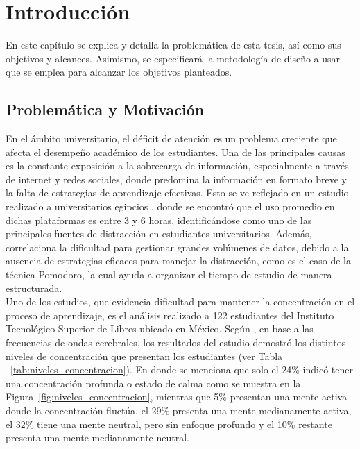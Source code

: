 \chapter{Introducción}
\label{ch:CH01}
En este capítulo se explica y detalla la problemática de esta tesis, así como sus objetivos y alcances. Asimismo, se especificará la metodología de diseño a usar que se emplea para alcanzar los objetivos planteados.
\section{Problemática y Motivación}
\label{sec:CH01_Problematica}

En el ámbito universitario, el déficit de atención es un problema creciente que afecta el desempeño académico de los estudiantes. Una de las principales causas es la constante exposición a la sobrecarga de información, especialmente a través de internet y redes sociales, donde predomina la información en formato breve y la falta de estrategias de aprendizaje efectivas. Esto se ve reflejado en un estudio realizado a universitarios egipcios \autocite{safy2024effect}, donde se encontró que el uso promedio en dichas plataformas es entre 3 y 6 horas, identificándose como uno de las principales fuentes de distracción en estudiantes universitarios. Además, correlaciona la dificultad para gestionar grandes volúmenes de datos, debido a la ausencia de estrategias eficaces para manejar la distracción, como  es el caso de la técnica Pomodoro, la cual ayuda a organizar el tiempo de estudio de manera estructurada.\\

Uno de los estudios, que evidencia dificultad para mantener la concentración en el proceso de aprendizaje, es el análisis realizado a 122 estudiantes del Instituto Tecnológico Superior de Libres ubicado en México. Según \textcite{baez2021analisis}, en base a las frecuencias de ondas cerebrales, los resultados del estudio demostró los distintos niveles de concentración que presentan los estudiantes (ver Tabla ~\ref{tab:niveles_concentracion}). En donde se menciona que solo el 24\% indicó tener una concentración profunda o estado de calma como se muestra en la Figura~\ref{fig:niveles_concentracion}, mientras que 5\% presentan una mente activa donde la concentración fluctúa, el 29\% presenta una mente medianamente activa, el 32\% tiene una mente neutral, pero sin enfoque profundo y el 10\% restante presenta una mente medianamente neutral.

